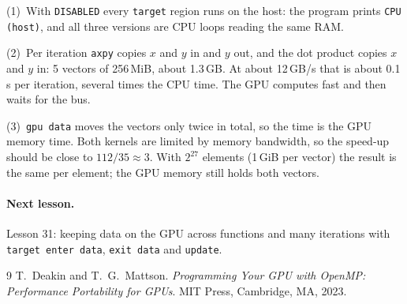 \documentclass[11pt,a4paper]{article}
\let\origtexttt\texttt
\renewcommand{\texttt}[1]{\textcolor{black!60}{\origtexttt{#1}}}
\begin{document}
\noindent(1)~With \texttt{DISABLED} every \texttt{target} region runs on the host: the program
prints \texttt{CPU (host)}, and all three versions are CPU loops reading the same RAM.

\noindent(2)~Per iteration \texttt{axpy} copies $x$ and $y$ in and $y$ out, and the dot product
copies $x$ and $y$ in: 5 vectors of 256\,MiB, about 1.3\,GB. At about 12\,GB/s that is about
0.1\,s per iteration, several times the CPU time. The GPU computes fast and then waits for the
bus.

\noindent(3)~\texttt{gpu data} moves the vectors only twice in total, so the time is the GPU
memory time. Both kernels are limited by memory bandwidth, so the speed-up should be close to
$112/35 \approx 3$. With $2^{27}$ elements (1\,GiB per vector) the result is the same per
element; the GPU memory still holds both vectors.

\paragraph{Next lesson.} Lesson 31: keeping data on the GPU across functions and many
iterations with \texttt{target enter data}, \texttt{exit data} and \texttt{update}.

\begin{thebibliography}{9}
 T.~Deakin and T.~G.~Mattson. \emph{Programming Your GPU with OpenMP: Performance
  Portability for GPUs}. MIT Press, Cambridge, MA, 2023.
\end{thebibliography}
\end{document}

